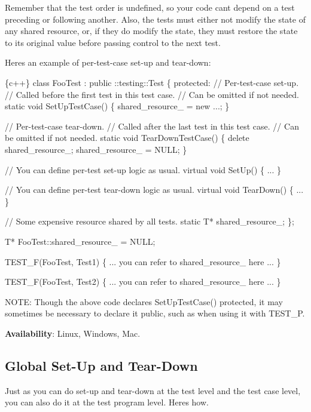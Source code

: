 Remember that the test order is undefined, so your code can\textquotesingle{}t depend on a test preceding or following another. Also, the tests must either not modify the state of any shared resource, or, if they do modify the state, they must restore the state to its original value before passing control to the next test.

Here\textquotesingle{}s an example of per-\/test-\/case set-\/up and tear-\/down\+:


\begin{DoxyCode}
\{c++\}
class FooTest : public ::testing::Test \{
 protected:
  // Per-test-case set-up.
  // Called before the first test in this test case.
  // Can be omitted if not needed.
  static void SetUpTestCase() \{
    shared\_resource\_ = new ...;
  \}

  // Per-test-case tear-down.
  // Called after the last test in this test case.
  // Can be omitted if not needed.
  static void TearDownTestCase() \{
    delete shared\_resource\_;
    shared\_resource\_ = NULL;
  \}

  // You can define per-test set-up logic as usual.
  virtual void SetUp() \{ ... \}

  // You can define per-test tear-down logic as usual.
  virtual void TearDown() \{ ... \}

  // Some expensive resource shared by all tests.
  static T* shared\_resource\_;
\};

T* FooTest::shared\_resource\_ = NULL;

TEST\_F(FooTest, Test1) \{
  ... you can refer to shared\_resource\_ here ...
\}

TEST\_F(FooTest, Test2) \{
  ... you can refer to shared\_resource\_ here ...
\}
\end{DoxyCode}


N\+O\+TE\+: Though the above code declares {\ttfamily Set\+Up\+Test\+Case()} protected, it may sometimes be necessary to declare it public, such as when using it with {\ttfamily T\+E\+S\+T\+\_\+P}.

{\bfseries Availability}\+: Linux, Windows, Mac.

\subsection*{Global Set-\/\+Up and Tear-\/\+Down}

Just as you can do set-\/up and tear-\/down at the test level and the test case level, you can also do it at the test program level. Here\textquotesingle{}s how.

